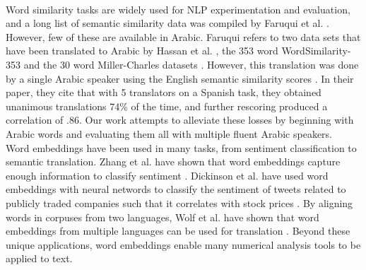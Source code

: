 \\
Word similarity tasks are widely used for NLP experimentation and evaluation, and a long list of semantic similarity data was compiled by Faruqui et al. \cite{faruqui:2014}. However, few of these are available in Arabic. Faruqui refers to two data sets that have been translated to Arabic by Hassan et al. \cite{hassan:2009}, the 353 word WordSimilarity-353 and the 30 word Miller-Charles datasets \cite{finkelstein:2001,miller:1991}. However, this translation was done by a single Arabic speaker using the English semantic similarity scores \cite{hassan:2009}. In their paper, they cite that with 5 translators on a Spanish task, they obtained unanimous translations 74\% of the time, and further rescoring produced a correlation of .86. Our work attempts to alleviate these losses by beginning with Arabic words and evaluating them all with multiple fluent Arabic speakers.
\\
Word embeddings have been used in many tasks, from sentiment classification to semantic translation. Zhang et al. have shown that word embeddings capture enough information to classify sentiment \cite{zhang2015chinese}. Dickinson et al. have used word embeddings with neural networds to classify the sentiment of tweets related to publicly traded companies such that it correlates with stock prices \cite{dickinson2015sentiment}. By aligning words in corpuses from two languages, Wolf et al. have shown that word embeddings from multiple languages can be used for translation \cite{wolf2014joint}. Beyond these unique applications, word embeddings enable many numerical analysis tools to be applied to text.
\\
